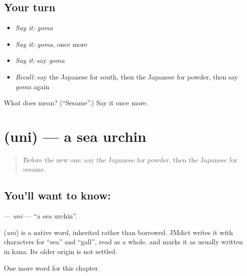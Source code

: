 \subsection*{Your turn}
\begin{itemize}
\raggedright
  \item \emph{Say it:} \emph{goma}
  \item \emph{Say it:} \emph{goma}, once more
  \item \emph{Say it:} say \emph{goma}
  \item \emph{Recall:} say the Japanese for south, then the Japanese for powder, then say \emph{goma} again
\end{itemize}

\begin{tcolorbox}[breakable,colback=teal!4,colframe=teal!35!black,title={Before you move on}]
What does  mean? (\textquotedblleft{}Sesame\textquotedblright{}.) Say it once more.
\end{tcolorbox}
\section[\texorpdfstring{\ja{うに} (uni)}{うに (uni)}]{ (uni) — a sea urchin}

\label{lesson:JA-C64-uni}



\begin{quote}
Before the new one: say the Japanese for powder, then the Japanese for sesame.
\end{quote}

\subsection*{You'll want to know: }
\textbf{} — \emph{uni} — \textquotedblleft{}a sea urchin\textquotedblright{}.

\begin{cousinweb}
\textbf{} (\emph{uni}) is a native word, inherited rather than borrowed. JMdict writes it with characters for \textquotedblleft{}sea\textquotedblright{} and \textquotedblleft{}gall\textquotedblright{}, read as a whole, and marks it as usually written in kana. Its older origin is not settled.
\end{cousinweb}

\begin{grammarlens}[title={What you've built}]
One more word for this chapter.
\end{grammarlens}

